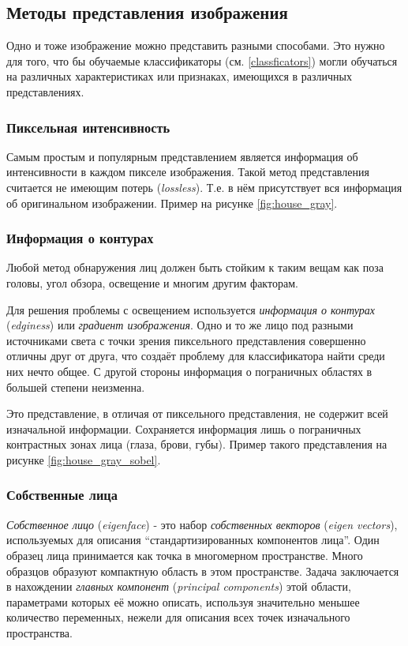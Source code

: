 \documentclass[12pt]{report}
\begin{document}
\subsection{Методы представления изображения}
Одно и тоже изображение можно представить разными способами. Это нужно для того, что бы обучаемые классификаторы 
(см. 
\ref{classficators}) могли обучаться на различных характеристиках или признаках, имеющихся в различных 
представлениях. 

\subsubsection{Пиксельная интенсивность}
Самым простым и популярным представлением является информация об интенсивности в каждом пикселе изображения. Такой 
метод представления считается не имеющим потерь (\textit{lossless}). Т.е. в нём присутствует  вся информация об 
оригинальном изображении. \citep{bojkovic2006face} Пример на рисунке \ref{fig:house_gray}.

\subsubsection{Информация о контурах}
Любой метод обнаружения лиц%
 должен быть стойким к таким вещам 
как поза головы, угол обзора, освещение и многим другим факторам. 

Для решения проблемы с освещением используется \emph{информация о контурах} (\textit{edginess}) или \emph{градиент 
изображения}. Одно и то же лицо под разными источниками света с точки зрения пиксельного представления совершенно 
отличны друг от друга, что создаёт проблему для классификатора найти среди них нечто общее. С другой стороны 
информация о пограничных областях в большей степени неизменна. \citep{ahmadyfard2008hierarchical}

Это представление, в отличая от пиксельного представления, не содержит всей изначальной информации. Сохраняется 
информация лишь о пограничных контрастных зонах лица (глаза, брови, губы). Пример такого представления на рисунке 
\ref{fig:house_gray_sobel}.

\subsubsection{Собственные лица}
\emph{Собственное лицо} (\textit{eigenface}) - это набор \emph{собственных векторов} (\textit{eigen vectors}), 
используемых для описания ``стандартизированных  компонентов лица''. Один образец лица принимается как точка в 
многомерном пространстве. Много образцов образуют компактную область в этом пространстве. Задача заключается в 
нахождении 
\emph{главных компонент} (\textit{principal components}) этой области, параметрами которых её можно описать, 
используя значительно меньшее количество переменных, нежели для описания всех точек изначального пространства.
\citep{turk1991eigenfaces}
\end{document}
